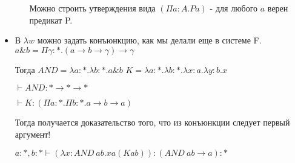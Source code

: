 \begin{itemize}
\begin{enumerate}
	    Можно строить утверждения вида $(\Pi a : A. P a)$ - для любого $a$ верен предикат P.

	\end{enumerate}

    \item В $\lambda w$ можно задать конъюнкцию, как мы делали еще в системе F. $a \& b = \Pi \gamma : * . (a \rightarrow b \rightarrow \gamma) \rightarrow \gamma$

    Тогда $AND = \lambda a : *. \lambda b : *. a \& b$
    $K = \lambda a : *. \lambda b : *. \lambda x : a . \lambda y : b. x$

    $\vdash AND : * \rightarrow * \rightarrow *$

    $\vdash K : (\Pi a : *. \Pi b : *. a \rightarrow b \rightarrow a)$

    Тогда получается доказательство того, что из конъюнкции следует первый аргумент!

    $a : *, b : * \vdash (\lambda x : AND \: a b. x a (K a b)) : (AND \: a b \rightarrow a) : *$

\end{itemize}

